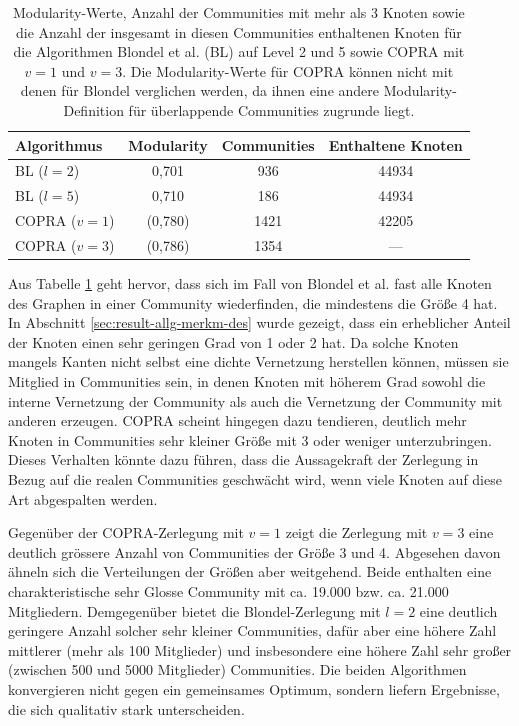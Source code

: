 \begin{table}[t]
  \centering
  \footnotesize
  \begin{tabular}{l|c|c|c}
    Algorithmus & Modularity & Communities &
    Enthaltene Knoten \\
    \hline
    BL ($l=2$)& 0,701 & 936 & 44934 \\
    BL ($l=5$)& 0,710 & 186 & 44934 \\
    \hline
    COPRA ($v=1$) & (0,780) & 1421 & 42205 \\
    COPRA ($v=3$) & (0,786) & 1354 & --- \\

  \end{tabular}
  \caption{Modularity-Werte, Anzahl der Communities mit mehr als 3
    Knoten sowie die Anzahl der insgesamt in diesen Communities enthaltenen
    Knoten 
    für die Algorithmen 
    Blondel et al. (BL) auf Level 2 und 5 sowie COPRA mit $v=1$ und
    $v=3$. Die
    Modularity-Werte für COPRA können nicht mit denen für
    Blondel verglichen werden, da ihnen eine andere
    Modularity-Definition für überlappende Communities zugrunde
    liegt.}
  \label{tab:mod-result}
\end{table}

Aus Tabelle \ref{tab:mod-result} geht hervor, dass sich im Fall von
Blondel et al. fast alle Knoten des Graphen in einer Community
wiederfinden, die mindestens die Größe 4 hat. In Abschnitt
\ref{sec:result-allg-merkm-des} wurde gezeigt, dass ein erheblicher
Anteil der Knoten einen sehr geringen Grad von 1 oder 2 hat. Da solche
Knoten mangels Kanten nicht selbst eine dichte Vernetzung herstellen
können, müssen sie Mitglied in Communities sein, in denen Knoten
mit höherem Grad sowohl die interne Vernetzung der Community als
auch die Vernetzung der Community mit anderen erzeugen. COPRA scheint
hingegen dazu tendieren, deutlich mehr Knoten in Communities sehr
kleiner Größe mit 3 oder weniger unterzubringen. Dieses Verhalten
könnte dazu führen, dass die Aussagekraft der Zerlegung in Bezug
auf die realen Communities geschwächt wird, wenn viele Knoten auf
diese Art abgespalten werden.

Gegenüber der COPRA-Zerlegung mit $v=1$ zeigt die Zerlegung mit
$v=3$ eine deutlich grössere Anzahl von Communities der Größe 3
und 4. Abgesehen davon ähneln sich die Verteilungen der Größen aber
weitgehend. Beide enthalten eine charakteristische sehr Glosse
Community mit ca. 19.000 bzw. ca. 21.000 Mitgliedern. Demgegenüber
bietet die Blondel-Zerlegung mit $l=2$ eine deutlich geringere Anzahl
solcher sehr kleiner Communities, dafür aber eine höhere Zahl
mittlerer (mehr als 100 Mitglieder) und insbesondere eine höhere
Zahl sehr großer (zwischen 500 und 5000 Mitglieder) Communities.  Die
beiden Algorithmen konvergieren nicht gegen ein gemeinsames Optimum,
sondern liefern Ergebnisse, die sich qualitativ stark unterscheiden.

